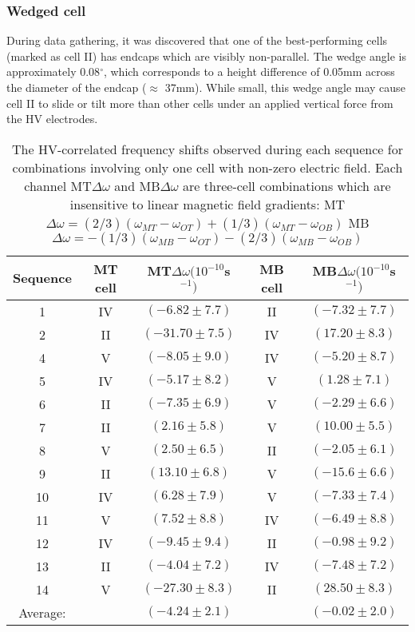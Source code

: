 \documentclass [10pt, twoside] {uwthesis}[2012/04/02]
\begin{document}
\subsubsection{Wedged cell}
During data gathering, it was discovered that one of the best-performing cells (marked as cell II) has endcaps which are visibly non-parallel. The wedge angle is approximately 0.08$^{\circ}$, which corresponds to a height difference of 0.05mm across the diameter of the endcap ($\approx$ 37mm). While small, this wedge angle may cause cell II to slide or tilt more than other cells under an applied vertical force from the HV electrodes. 
\begin{table}[ht]
\begin{center} 																						
\caption[Middle cell HV frequency shift by sequence] 
{\narrower The HV-correlated frequency shifts observed during each sequence for combinations involving only one cell with non-zero electric field. Each channel MT$\Delta\omega$ and MB$\Delta\omega$ are three-cell combinations which are insensitive to linear magnetic field gradients: MT$\Delta\omega = (2/3)(\omega_{MT}-\omega_{OT}) + (1/3)(\omega_{MT}-\omega_{OB}) $
MB$\Delta\omega = -(1/3)(\omega_{MB}-\omega_{OT}) - (2/3)(\omega_{MB}-\omega_{OB})$
} \label{Single_cell_EDM_sig}	
\begin{tabular}{ccccc}
\hline \hline 
Sequence & MT cell & MT$\Delta\omega (10^{-10}$s$^{-1})$ & MB cell & MB$\Delta\omega(10^{-10}$s$^{-1})$ \\ [0.5ex]	
\hline                   		
1&IV&  $(-6.82 \pm 7.7)$	&II&	$(-7.32 \pm 7.7)$\\
2&II&  $(-31.70\pm 7.5)$	&IV&	$(17.20 \pm 8.3)$\\
4&V&   $(-8.05 \pm 9.0)$	&IV&	$(-5.20 \pm 8.7)$\\
5&IV&  $(-5.17 \pm 8.2)$	&V&		$(1.28  \pm 7.1)$\\
6&II&  $(-7.35 \pm 6.9)$	&V&		$(-2.29 \pm 6.6)$\\
7&II&  $(2.16  \pm 5.8)$	&V&		$(10.00 \pm 5.5)$\\
8&V&   $(2.50  \pm 6.5)$	&II&	$(-2.05 \pm 6.1)$\\
9&II&  $(13.10 \pm 6.8)$	&V&		$(-15.6 \pm 6.6)$\\
10&IV& $(6.28  \pm 7.9)$	&V&		$(-7.33 \pm 7.4)$\\
11&V&  $(7.52  \pm 8.8)$	&IV&	$(-6.49 \pm 8.8)$\\
12&IV& $(-9.45 \pm 9.4)$	&II&	$(-0.98 \pm 9.2)$\\
13&II& $(-4.04 \pm 7.2)$	&IV&	$(-7.48 \pm 7.2)$\\
14&V&  $(-27.30\pm 8.3)$	&II&	$(28.50 \pm 8.3)$\\
Average:&&  $(-4.24\pm 2.1)$&&		$(-0.02 \pm 2.0)$\\
[1ex]	
\hline
\end{tabular}
\end{center} 														
\end{table}
\end{document}
